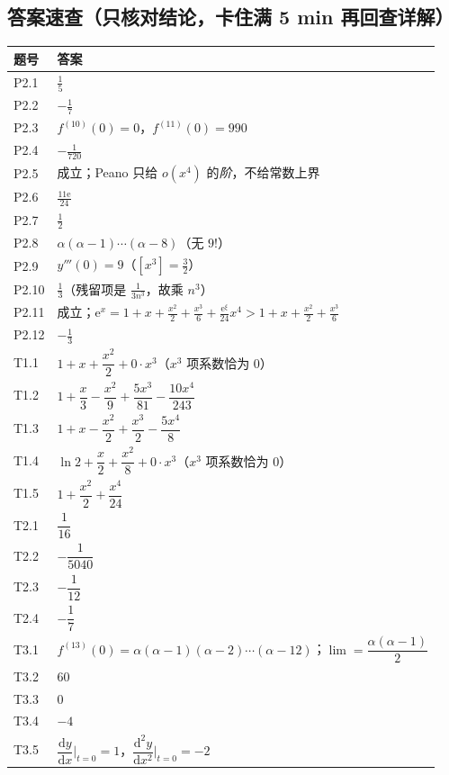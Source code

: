 \documentclass[11pt,a4paper]{ctexart}
\newcommand{\ee}{\mathrm{e}}
\newcommand{\D}{\mathrm{d}}
\begin{document}
\subsection{答案速查（只核对结论，卡住满 5 min 再回查详解）}
{\footnotesize
\begin{longtable}{@{}p{1.5cm}p{13.6cm}@{}}
\toprule 题号 & 答案 \\ \midrule \endhead
\bottomrule \endlastfoot
P2.1 & $\frac{1}{5}$ \\
P2.2 & $-\frac{1}{7}$ \\
P2.3 & $f^{(10)}(0)=0$，$f^{(11)}(0)=990$ \\
P2.4 & $-\frac{1}{720}$ \\
P2.5 & 成立；Peano 只给 $o(x^{4})$ 的\emph{阶}，不给常数上界 \\
P2.6 & $\frac{11\ee}{24}$ \\
P2.7 & $\frac{1}{2}$ \\
P2.8 & $\alpha(\alpha-1)\cdots(\alpha-8)$（无 $9!$） \\
P2.9 & $y'''(0)=9$（$[x^{3}]=\frac{3}{2}$） \\
P2.10 & $\frac{1}{3}$（残留项是 $\frac{1}{3n^{3}}$，故乘 $n^{3}$） \\
P2.11 & 成立；$\ee^{x}=1+x+\frac{x^{2}}{2}+\frac{x^{3}}{6}+\frac{\ee^{\xi}}{24}x^{4}>1+x+\frac{x^{2}}{2}+\frac{x^{3}}{6}$ \\
P2.12 & $-\frac{1}{3}$ \\
T1.1 & $1+x+\dfrac{x^{2}}{2}+0\cdot x^{3}$（$x^{3}$ 项系数恰为 $0$） \\
T1.2 & $1+\dfrac{x}{3}-\dfrac{x^{2}}{9}+\dfrac{5x^{3}}{81}-\dfrac{10x^{4}}{243}$ \\
T1.3 & $1+x-\dfrac{x^{2}}{2}+\dfrac{x^{3}}{2}-\dfrac{5x^{4}}{8}$ \\
T1.4 & $\ln 2+\dfrac{x}{2}+\dfrac{x^{2}}{8}+0\cdot x^{3}$（$x^{3}$ 项系数恰为 $0$） \\
T1.5 & $1+\dfrac{x^{2}}{2}+\dfrac{x^{4}}{24}$ \\
T2.1 & $\dfrac1{16}$ \\
T2.2 & $-\dfrac1{5040}$ \\
T2.3 & $-\dfrac1{12}$ \\
T2.4 & $-\dfrac17$ \\
T3.1 & $f^{(13)}(0)=\alpha(\alpha-1)(\alpha-2)\cdots(\alpha-12)$；$\lim=\dfrac{\alpha(\alpha-1)}{2}$ \\
T3.2 & $60$ \\
T3.3 & $0$ \\
T3.4 & $-4$ \\
T3.5 & $\dfrac{\D y}{\D x}\big|_{t=0}=1$，$\dfrac{\D^{2}y}{\D x^{2}}\big|_{t=0}=-2$ \\

\end{longtable}}
\end{document}
